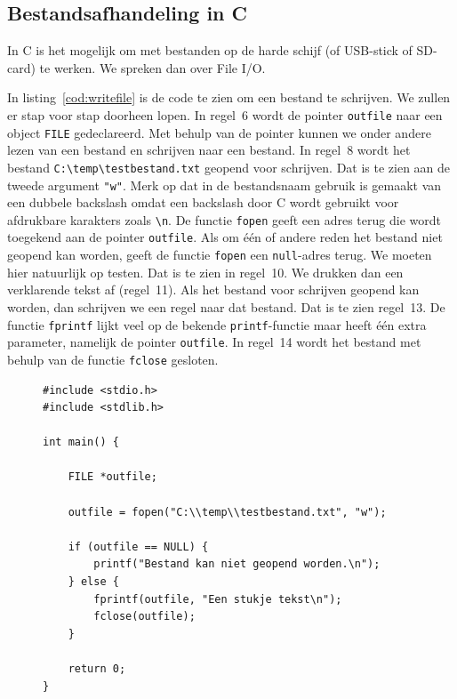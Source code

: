 \documentclass[a4paper,10pt,fleqn,twoside]{article}
\begin{document}
\subsection{Bestandsafhandeling in C}
In C is het mogelijk om met bestanden op de harde schijf (of USB-stick of SD-card) te werken. We spreken dan over File I/O.

In listing~\ref{cod:writefile} is de code te zien om een bestand te schrijven. We zullen er stap voor stap doorheen lopen. In regel~6 wordt de pointer \lstinline|outfile| naar een object \lstinline|FILE| gedeclareerd. Met behulp van de pointer kunnen we onder andere lezen van een bestand en schrijven naar een bestand. In regel~8 wordt het bestand \lstinline|C:\temp\testbestand.txt| geopend voor schrijven. Dat is te zien aan de tweede argument \lstinline|"w"|. Merk op dat in de bestandsnaam gebruik is gemaakt van een dubbele backslash omdat een backslash door C wordt gebruikt voor afdrukbare karakters zoals \lstinline|\n|. De functie \lstinline|fopen| geeft een adres terug die wordt toegekend aan de pointer \lstinline|outfile|. Als om \'e\'en of andere reden het bestand niet geopend kan worden, geeft de functie \lstinline|fopen| een \lstinline|null|-adres terug. We moeten hier natuurlijk op testen. Dat is te zien in regel~10. We drukken dan een verklarende tekst af (regel~11). Als het bestand voor schrijven geopend kan worden, dan schrijven we een regel naar dat bestand. Dat is te zien regel~13. De functie \lstinline|fprintf| lijkt veel op de bekende \lstinline|printf|-functie maar heeft \'e\'en extra parameter, namelijk de pointer \lstinline|outfile|. In regel~14 wordt het bestand met behulp van de functie \lstinline|fclose| gesloten.

\begin{figure}[H]
\begin{lstlisting}[caption=Voorbeeld schrijven naar een bestand.,label=cod:writefile]
#include <stdio.h>
#include <stdlib.h>
	
int main() {

	FILE *outfile;
	
	outfile = fopen("C:\\temp\\testbestand.txt", "w");
	
	if (outfile == NULL) {
		printf("Bestand kan niet geopend worden.\n");
	} else {
		fprintf(outfile, "Een stukje tekst\n");
		fclose(outfile);
	}
	
	return 0;
}
\end{lstlisting}
\end{figure}
\end{document}
